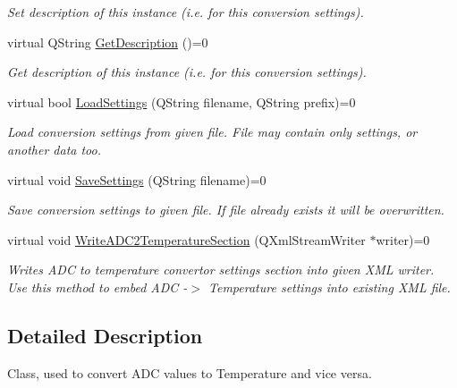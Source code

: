 \begin{DoxyCompactItemize}
\begin{DoxyCompactList}\small\item\em Set description of this instance (i.\+e. for this conversion settings). \end{DoxyCompactList}\item 
virtual Q\+String \hyperlink{class_interfaces_1_1_i_adc_temperature_convertor_a2f3b59be793c3ed43e880ef12e9749bc}{Get\+Description} ()=0
\begin{DoxyCompactList}\small\item\em Get description of this instance (i.\+e. for this conversion settings). \end{DoxyCompactList}\item 
virtual bool \hyperlink{class_interfaces_1_1_i_adc_temperature_convertor_a3b1d84ea243b62a36238f16433668a23}{Load\+Settings} (Q\+String filename, Q\+String prefix)=0
\begin{DoxyCompactList}\small\item\em Load conversion settings from given file. File may contain only settings, or another data too. \end{DoxyCompactList}\item 
virtual void \hyperlink{class_interfaces_1_1_i_adc_temperature_convertor_a6631e979e067ab78d3e5c337449876ac}{Save\+Settings} (Q\+String filename)=0
\begin{DoxyCompactList}\small\item\em Save conversion settings to given file. If file already exists it will be overwritten. \end{DoxyCompactList}\item 
virtual void \hyperlink{class_interfaces_1_1_i_adc_temperature_convertor_abc7ed5fdfeaed255af14930431b46ac1}{Write\+A\+D\+C2\+Temperature\+Section} (Q\+Xml\+Stream\+Writer $\ast$writer)=0
\begin{DoxyCompactList}\small\item\em Writes A\+DC to temperature convertor settings section into given X\+ML writer. Use this method to embed A\+DC -\/$>$ Temperature settings into existing X\+ML file. \end{DoxyCompactList}\end{DoxyCompactItemize}


\subsection{Detailed Description}
Class, used to convert A\+DC values to Temperature and vice versa. 

